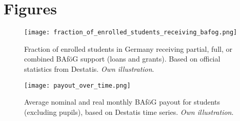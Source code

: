 \newpage
\section{Figures}
\renewcommand{\thefigure}{\thesection \arabic{figure}}
\setcounter{figure}{0}

\begin{figure}[H]
  \centering

  \begin{minipage}[t]{0.48\textwidth}
    \centering
    \texttt{[image: fraction\_of\_enrolled\_students\_receiving\_bafog.png]}
    \caption{
      Fraction of enrolled students in Germany receiving partial, full, or combined BAföG support (loans and grants). Based on official statistics from Destatis. \textit{Own illustration}.
    }
    \label{figure:bafoeg_support}
  \end{minipage}%
  \hfill
  \begin{minipage}[t]{0.48\textwidth}
    \centering
    \texttt{[image: payout\_over\_time.png]}
    \caption{
      Average nominal and real monthly BAföG payout for students (excluding pupils), based on Destatis time series. \textit{Own illustration}.
    }
    \label{figure:payout_over_time}
  \end{minipage}

\end{figure}
